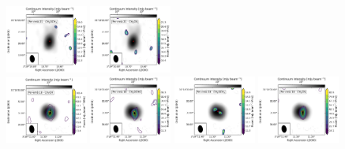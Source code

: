 \begin{figure}[htbp!]
  \includegraphics[width=0.24\textwidth]{./moment0/Set2_ID05_CH3OCH3_259311.pdf}
  \includegraphics[width=0.24\textwidth]{./moment0/Set2_ID05_CH3CN_257527.pdf}
  \\
  \includegraphics[width=0.24\textwidth]{./moment0/Set2_ID12_CH3OH_243915.pdf}
  \includegraphics[width=0.24\textwidth]{./moment0/Set2_ID12_CH3OCHO_259342.pdf}
  \includegraphics[width=0.24\textwidth]{./moment0/Set2_ID12_CH3OCH3_259311.pdf}
  \includegraphics[width=0.24\textwidth]{./moment0/Set2_ID12_CH3CN_257527.pdf}
  \\
  \caption{}
\end{figure}
\addtocounter{figure}{-1}
